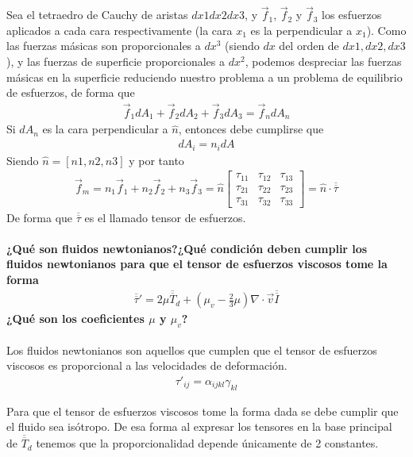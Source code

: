 \documentclass[a4paper]{article}
\begin{document}
Sea el tetraedro de Cauchy de aristas $dx1dx2dx3$, y $\vec{f}_1$, $\vec{f}_2$ y $\vec{f}_3$ 
los esfuerzos aplicados a cada cara respectivamente (la cara $x_1$ 
es la perpendicular a $x_1$). Como las fuerzas másicas son proporcionales
a $dx^3$ (siendo $dx$ del orden de $dx1,dx2,dx3$), y las fuerzas
de superficie proporcionales a $dx^2$, podemos despreciar las fuerzas
másicas en la superficie reduciendo nuestro problema a un problema 
de equilibrio de esfuerzos, de forma que 
\begin{align*}
	\vec{f}_1 dA_1 + \vec{f}_2 dA_2 + \vec{f}_3 dA_3 = \vec{f}_n dA_n
\end{align*}
Si  $dA_n$ es la cara perpendicular a $\hat{n}$, entonces debe cumplirse que
\begin{align*}
	dA_i = n_i dA
\end{align*}
Siendo $\hat{n} = \left[ n1, n2, n3\right]$ y por tanto 
\begin{align*}
	\vec{f}_m =  n_1 \vec{f}_1 + n_2 \vec{f}_2+n_3 \vec{f}_3 = \hat{n}
	\begin{bmatrix}\tau_{11} &\tau_{12} &\tau_{13} \\\tau_{21} &\tau_{22} &\tau_{23} \\\tau_{31} &\tau_{32} &\tau_{33}   \end{bmatrix} = \hat{n} \cdot \overline{\overline{\tau}}
\end{align*}
De forma que $\overline{\overline{\tau}}$ es el llamado tensor de esfuerzos.


\newpage
\paragraph{¿Qué son fluidos newtonianos?¿Qué condición deben cumplir
los fluidos newtonianos para que el tensor de esfuerzos viscosos tome
la forma 
\begin{align*}
	\overline{\overline{\tau}}' = 2\mu \overline{\overline{T}}_d + (\mu_v - \frac{2}{3}\mu) \nabla\cdot \vec{v} \overline{\overline{I}}
\end{align*}
¿Qué son los coeficientes $\mu$ y $\mu_v$?} 

Los fluidos newtonianos son aquellos que cumplen que el tensor de 
esfuerzos viscosos es proporcional a las velocidades de deformación.
\begin{align*}
\tau'_{ij} = \alpha_{ijkl}\gamma_{kl}
\end{align*}

Para que el tensor de esfuerzos viscosos tome la forma dada se debe
cumplir que el fluido sea isótropo. De esa forma al expresar los 
tensores en la base principal de $\overline{\overline{T}}_d$ tenemos
que la proporcionalidad depende únicamente de 2 constantes. 
\end{document}

